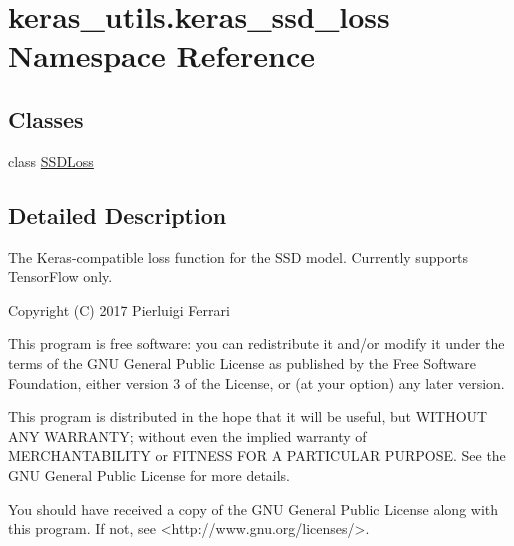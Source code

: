 \hypertarget{namespacekeras__utils_1_1keras__ssd__loss}{}\section{keras\+\_\+utils.\+keras\+\_\+ssd\+\_\+loss Namespace Reference}
\label{namespacekeras__utils_1_1keras__ssd__loss}
\subsection*{Classes}
\begin{DoxyCompactItemize}
\item 
class \hyperlink{classkeras__utils_1_1keras__ssd__loss_1_1_s_s_d_loss}{S\+S\+D\+Loss}
\end{DoxyCompactItemize}


\subsection{Detailed Description}
\begin{DoxyVerb}The Keras-compatible loss function for the SSD model. Currently supports TensorFlow only.

Copyright (C) 2017 Pierluigi Ferrari

This program is free software: you can redistribute it and/or modify
it under the terms of the GNU General Public License as published by
the Free Software Foundation, either version 3 of the License, or
(at your option) any later version.

This program is distributed in the hope that it will be useful,
but WITHOUT ANY WARRANTY; without even the implied warranty of
MERCHANTABILITY or FITNESS FOR A PARTICULAR PURPOSE.  See the
GNU General Public License for more details.

You should have received a copy of the GNU General Public License
along with this program.  If not, see <http://www.gnu.org/licenses/>.
\end{DoxyVerb}
 